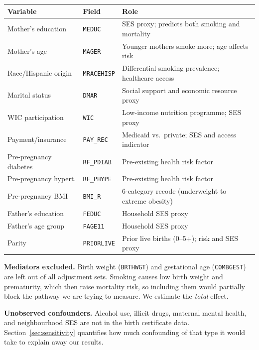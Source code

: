 \documentclass[11pt]{article}
\begin{document}
\begin{center}
\small
\begin{tabular}{lll}
\toprule
\textbf{Variable} & \textbf{Field} & \textbf{Role} \\
\midrule
Mother's education    & \texttt{MEDUC}     & SES proxy; predicts both smoking and mortality \\
Mother's age          & \texttt{MAGER}     & Younger mothers smoke more; age affects risk \\
Race/Hispanic origin  & \texttt{MRACEHISP} & Differential smoking prevalence; healthcare access \\
Marital status        & \texttt{DMAR}      & Social support and economic resource proxy \\
WIC participation     & \texttt{WIC}       & Low-income nutrition programme; SES proxy \\
Payment/insurance     & \texttt{PAY\_REC}  & Medicaid vs.\ private; SES and access indicator \\
Pre-pregnancy diabetes& \texttt{RF\_PDIAB} & Pre-existing health risk factor \\
Pre-pregnancy hypert. & \texttt{RF\_PHYPE} & Pre-existing health risk factor \\
Pre-pregnancy BMI     & \texttt{BMI\_R}    & 6-category recode (underweight to extreme obesity) \\
Father's education    & \texttt{FEDUC}     & Household SES proxy \\
Father's age group    & \texttt{FAGE11}    & Household SES proxy \\
Parity                & \texttt{PRIORLIVE} & Prior live births (0--5+); risk and SES proxy \\
\bottomrule
\end{tabular}
\end{center}

\textbf{Mediators excluded.} Birth weight (\texttt{BRTHWGT}) and gestational age
(\texttt{COMBGEST}) are left out of all adjustment sets. Smoking causes low birth
weight and prematurity, which then raise mortality risk, so including them would
partially block the pathway we are trying to measure. We estimate the
\emph{total} effect.

\textbf{Unobserved confounders.} Alcohol use, illicit drugs, maternal mental health,
and neighbourhood SES are not in the birth certificate data.
Section~\ref{sec:sensitivity} quantifies how much confounding of that type it
would take to explain away our results.
\end{document}
